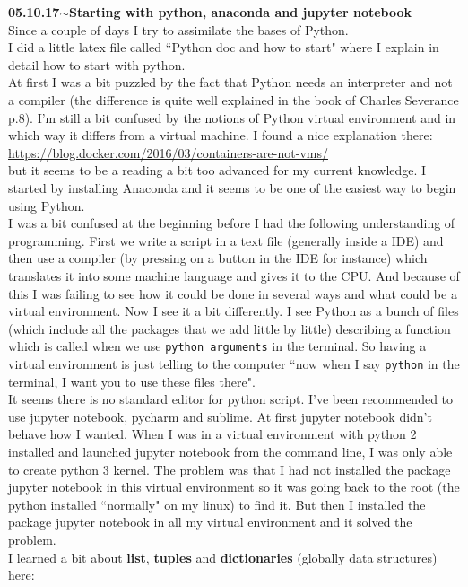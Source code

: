 \documentclass[11pt,a4paper]{article}
\newenvironment{loggentry}[2]%
{\noindent\textbf{#1}\hspace{1cm}$\mathbf{\sim}$\text{ }\textbf{#2}\\}{\vspace{0.5cm}}
\begin{document}
\begin{loggentry}{05.10.17}{Starting with python, anaconda and jupyter notebook}
Since a couple of days I try to assimilate the bases of Python.\\
I did a little latex file called ``Python doc and how to start" where I explain in detail how to start with python.\\
At first I was a bit puzzled by the fact that Python needs an interpreter and not a compiler (the difference is quite well explained in the book of Charles Severance p.8). I'm still a bit confused by the notions of Python virtual environment and in which way it differs from a virtual machine. I found a nice explanation there:\\
\url{https://blog.docker.com/2016/03/containers-are-not-vms/}\\
but it seems to be a reading a bit too advanced for my current knowledge. I started by installing Anaconda and it seems to be one of the easiest way to begin using Python.\\
I was a bit confused at the beginning before I had the following understanding of programming. First we write a script in a text file (generally inside a IDE) and then use a compiler (by pressing on a button in the IDE for instance) which translates it into some machine language and gives it to the CPU. And because of this I was failing to see how it could be done in several ways and what could be a virtual environment. Now I see it a bit differently. I see Python as a bunch of files (which include all the packages that we add little by little) describing a function which is called when we use \texttt{python arguments} in the terminal. So having a virtual environment is just telling to the computer ``now when I say \texttt{python} in the terminal, I want you to use these files there".\\
It seems there is no standard editor for python script. I've been recommended to use jupyter notebook, pycharm and sublime. At first jupyter notebook didn't behave how I wanted. When I was in a virtual environment with python 2 installed and launched jupyter notebook from the command line, I was only able to create python 3 kernel. The problem was that I had not installed the package jupyter notebook in this virtual environment so it was going back to the root (the python installed ``normally" on my linux) to find it. But then I installed the package jupyter notebook in all my virtual environment and it solved the problem.\\
I learned a bit about \textbf{list}, \textbf{tuples} and \textbf{dictionaries} (globally data structures) here:\\

\end{loggentry}
\end{document}
